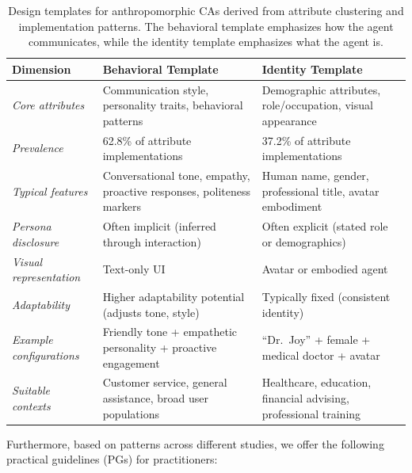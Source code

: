 \documentclass[manuscript,anonymous,sigconf]{acmart}
\begin{document}
\begin{table}[t]
\centering
\caption{Design templates for anthropomorphic CAs derived from attribute clustering and implementation patterns. The behavioral template emphasizes how the agent communicates, while the identity template emphasizes what the agent is.}
\label{tab:design_templates}
\begin{tabularx}{\textwidth}{@{}l X X@{}}
\toprule
\textbf{Dimension} & \textbf{Behavioral Template} & \textbf{Identity Template} \\
\midrule
\textit{Core attributes} & Communication style, personality traits, behavioral patterns & Demographic attributes, role/occupation, visual appearance \\
\midrule
\textit{Prevalence} & 62.8\% of attribute implementations & 37.2\% of attribute implementations \\
\midrule
\textit{Typical features} & Conversational tone, empathy, proactive responses, politeness markers & Human name, gender, professional title, avatar embodiment \\
\midrule
\textit{Persona disclosure} & Often implicit (inferred through interaction) & Often explicit (stated role or demographics) \\
\midrule
\textit{Visual representation} & Text-only UI & Avatar or embodied agent \\
\midrule
\textit{Adaptability} & Higher adaptability potential (adjusts tone, style) & Typically fixed (consistent identity) \\
\midrule
\textit{Example configurations} & Friendly tone + empathetic personality + proactive engagement & ``Dr.\ Joy'' + female + medical doctor + avatar \\
\midrule
\textit{Suitable contexts} & Customer service, general assistance, broad user populations & Healthcare, education, financial advising, professional training \\
\bottomrule
\end{tabularx}
\end{table}

Furthermore, based on patterns across different studies, we offer the following practical guidelines (PGs) for practitioners:
\end{document}
